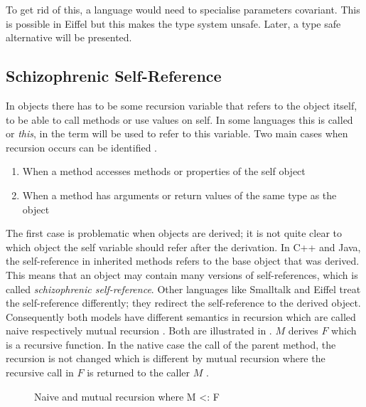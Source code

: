 To get rid of this, a language would need to specialise parameters
covariant. This is possible in Eiffel but this makes the type system
unsafe. Later, a type safe alternative will be presented.

\subsection{Schizophrenic Self-Reference}
\label{sec:schizoReferences}
In objects there has to be some recursion variable that refers to the
object itself, to be able to call methods or use values on self. In some
languages this is called \self or \emph{this}, in \ooplss
the term \self will be used to refer to this variable. Two main cases when
recursion occurs can be identified \cite{simons_theory_2003-2}.

\begin{enumerate}
	\item When a method accesses methods or properties of the self object
	\item When a method has arguments or return values of the same type as the object
\end{enumerate}

The first case is problematic when objects are derived; it is not
quite clear to which object the self variable should refer after
the derivation. In C++ and Java, the self-reference in inherited
methods refers to the base object that was derived. This means that an
object may contain many versions of self-references, which is called
\emph{schizophrenic self-reference}. Other languages like Smalltalk
and Eiffel treat the self-reference differently; they redirect the
self-reference to the derived object. Consequently both models have
different semantics in recursion which are called naive respectively
mutual recursion \cite{cook_denotational_1989}. Both are illustrated
in . $M$ derives $F$ which is a recursive
function. In the native case the call of the parent method, the recursion
is not changed which is different by mutual recursion where the recursive
call in $F$ is returned to the caller $M$ \cite{simons_theory_2003-2}.

\begin{figure}
	\centering
	\caption[Naive and mutual recursion where M <: F]{Naive and mutual recursion where M <: F \cite{cook_denotational_1989}}
	\label{fig:schizoRecursion}
\end{figure}

